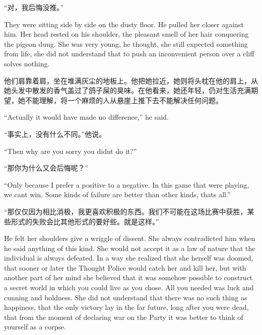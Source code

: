 \begin{paracol}{2}
\switchcolumn

``对，我后悔没推。''

\switchcolumn*

They were sitting side by side on the dusty floor. He pulled her closer
against him. Her head rested on his shoulder, the pleasant smell of her
hair conquering the pigeon dung. She was very young, he thought, she
still expected something from life, she did not understand that to push
an inconvenient person over a cliff solves nothing.

\switchcolumn

他们肩靠着肩，坐在堆满灰尘的地板上。他把她拉近，她则将头枕在他的肩上，从她头发中散发的香气盖过了鸽子屎的臭味。在他看来，她还年轻，仍对生活充满期望，她不能理解，将一个麻烦的人从悬崖上推下去不能解决任何问题。

\switchcolumn*

``Actually it would have made no difference,'' he said.

\switchcolumn

``事实上，没有什么不同。''他说。

\switchcolumn*

``Then why are you sorry you didn\textquotesingle t do it?''

\switchcolumn

``那你为什么又会后悔呢？''

\switchcolumn*

``Only because I prefer a positive to a negative. In this game that
we\textquotesingle re playing, we can\textquotesingle t win. Some kinds
of failure are better than other kinds, that\textquotesingle s all.''

\switchcolumn

``那仅仅因为相比消极，我更喜欢积极的东西。我们不可能在这场比赛中获胜，某些形式的失败会比其他形式的要好些。就是这样。''

\switchcolumn*

He felt her shoulders give a wriggle of dissent. She always contradicted
him when he said anything of this kind. She would not accept it as a law
of nature that the individual is always defeated. In a way she realized
that she herself was doomed, that sooner or later the Thought Police
would catch her and kill her, but with another part of her mind she
believed that it was somehow possible to construct a secret world in
which you could live as you chose. All you needed was luck and cunning
and boldness. She did not understand that there was no such thing as
happiness, that the only victory lay in the far future, long after you
were dead, that from the moment of declaring war on the Party it was
better to think of yourself as a corpse.


\end{paracol}
